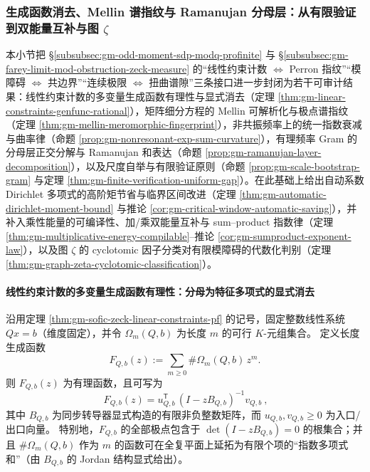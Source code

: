 \subsubsection{生成函数消去、Mellin 谱指纹与 Ramanujan 分母层：从有限验证到双能量互补与图 \texorpdfstring{$\zeta$}{zeta}}\label{subsubsec:gm-genfunc-mellin-ramanujan-bootstrap-sumproduct-graphzeta}
本小节把 \S\ref{subsubsec:gm-odd-moment-sdp-modq-profinite} 与 \S\ref{subsubsec:gm-farey-limit-mod-obstruction-zeck-measure} 的“线性约束计数 \(\Leftrightarrow\) Perron 指纹”“模障碍 \(\Leftrightarrow\) 共边界”“连续极限 \(\Leftrightarrow\) 扭曲谱隙”三条接口进一步封闭为若干可审计结果：线性约束计数的多变量生成函数有理性与显式消去（定理 \ref{thm:gm-linear-constraints-genfunc-rational}），矩阵细分方程的 Mellin 可解析化与极点谱指纹（定理 \ref{thm:gm-mellin-meromorphic-fingerprint}），非共振频率上的统一指数衰减与曲率律（命题 \ref{prop:gm-nonresonant-exp-sum-curvature}），有理频率 Gram 的分母层正交分解与 Ramanujan 和表达（命题 \ref{prop:gm-ramanujan-layer-decomposition}），以及尺度自举与有限验证原则（命题 \ref{prop:gm-scale-bootstrap-gram} 与定理 \ref{thm:gm-finite-verification-uniform-gap}）。在此基础上给出自动系数 Dirichlet 多项式的高阶矩节省与临界区间改进（定理 \ref{thm:gm-automatic-dirichlet-moment-bound} 与推论 \ref{cor:gm-critical-window-automatic-saving}），并补入乘性能量的可编译性、加/乘双能量互补与 sum--product 指数律（定理 \ref{thm:gm-multiplicative-energy-compilable}--推论 \ref{cor:gm-sumproduct-exponent-law}），以及图 \(\zeta\) 的 cyclotomic 因子分类对有限模障碍的代数化判别（定理 \ref{thm:gm-graph-zeta-cyclotomic-classification}）。

\paragraph{线性约束计数的多变量生成函数有理性：分母为特征多项式的显式消去}
\begin{theorem}\label{thm:gm-linear-constraints-genfunc-rational}
沿用定理 \ref{thm:gm-sofic-zeck-linear-constraints-pf} 的记号，固定整数线性系统 \(Qx=b\)（维度固定），并令 \(\Omega_m(Q,b)\) 为长度 \(m\) 的可行 \(K\)-元组集合。
定义长度生成函数
\[
F_{Q,b}(z):=\sum_{m\ge 0}\#\Omega_m(Q,b)\,z^m.
\]
则 \(F_{Q,b}(z)\) 为有理函数，且可写为
\begin{equation}\label{eq:gm-genfunc-resolvent}
\boxed{\ 
F_{Q,b}(z)
=u_{Q,b}^{\mathsf T}\,(I-zB_{Q,b})^{-1}v_{Q,b}\ } ,
\end{equation}
其中 \(B_{Q,b}\) 为同步转导器显式构造的有限非负整数矩阵，而 \(u_{Q,b},v_{Q,b}\ge 0\) 为入口/出口向量。
特别地，\(F_{Q,b}\) 的全部极点包含于
\(
\det(I-zB_{Q,b})=0
\)
的根集合；并且 \(\#\Omega_m(Q,b)\) 作为 \(m\) 的函数可在全复平面上延拓为有限个项的“指数多项式和”（由 \(B_{Q,b}\) 的 Jordan 结构显式给出）。
\end{theorem}

